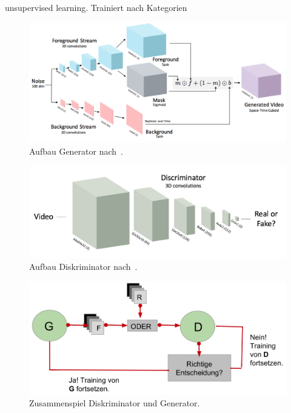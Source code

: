 \documentclass[times, 12pt,twocolumn]{article}
\begin{document}
unsupervised learning. 
Trainiert nach Kategorien



\begin{figure}
	\flushleft
	\includegraphics[width=\columnwidth]{Bilder/generator2.jpg}
	\caption{Aufbau Generator nach~\cite{Vondrick}.}
	\label{fig:generator}
\end{figure}


\begin{figure}
	\flushleft
	\includegraphics[width=\columnwidth]{Bilder/discriminator.jpg}
	\caption{Aufbau Diskriminator nach~\cite{Vondrick}.}
	\label{fig:discriminator}
\end{figure}

\begin{figure}
	\flushleft
	\includegraphics[width=\columnwidth]{Bilder/disAndGen.jpg}
	\caption{Zusammenspiel Diskriminator und Generator.}
	\label{fig:disAndGen}
\end{figure}
\end{document}
